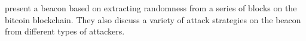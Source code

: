 \item[Bitcoin Beacon ($\pi_\text{beacon}$)] 
\citet{bentov2016bitcoin} present a beacon based on extracting randomness from a series of blocks on the bitcoin blockchain. They also discuss a variety of attack strategies on the beacon from different types of attackers.  
